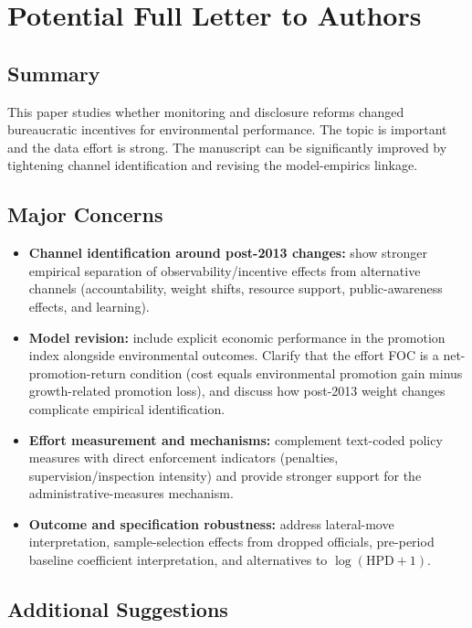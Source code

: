 \documentclass[12pt]{article}
\begin{document}
\section{Potential Full Letter to Authors}

\subsection*{Summary}

This paper studies whether monitoring and disclosure reforms changed bureaucratic incentives for environmental performance. The topic is important and the data effort is strong. The manuscript can be significantly improved by tightening channel identification and revising the model-empirics linkage.

\subsection*{Major Concerns}

\begin{itemize}
    \item \textbf{Channel identification around post-2013 changes:}
    show stronger empirical separation of observability/incentive effects from alternative channels (accountability, weight shifts, resource support, public-awareness effects, and learning).

    \item \textbf{Model revision:}
    include explicit economic performance in the promotion index alongside environmental outcomes. Clarify that the effort FOC is a net-promotion-return condition (cost equals environmental promotion gain minus growth-related promotion loss), and discuss how post-2013 weight changes complicate empirical identification.

    \item \textbf{Effort measurement and mechanisms:}
    complement text-coded policy measures with direct enforcement indicators (penalties, supervision/inspection intensity) and provide stronger support for the administrative-measures mechanism.

    \item \textbf{Outcome and specification robustness:}
    address lateral-move interpretation, sample-selection effects from dropped officials, pre-period baseline coefficient interpretation, and alternatives to $\log(\text{HPD}+1)$.
\end{itemize}

\subsection*{Additional Suggestions}
\end{document}
